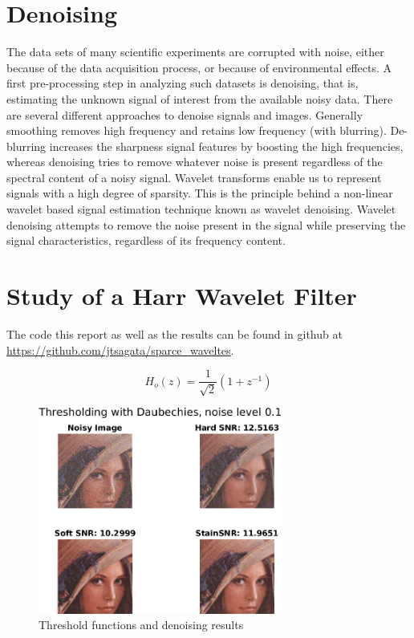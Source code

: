 \documentclass[a4paper,12pt]{article}
\begin{document}
\section {Denoising}
The data sets of many scientific experiments are corrupted with noise, either because of the data acquisition process, or because of environmental effects. A first pre-processing step in analyzing such datasets is denoising, that is, estimating the unknown signal of interest from the available noisy data. There are several different approaches to denoise signals and images. Generally smoothing removes high frequency and retains low frequency (with blurring). De-blurring increases the sharpness signal features by boosting the high frequencies, whereas denoising tries to remove whatever noise is present regardless of the spectral content of a noisy signal. Wavelet transforms enable us to represent signals with a high degree of sparsity. This is the principle behind a non-linear wavelet based signal estimation technique known as wavelet denoising. Wavelet denoising attempts to remove the noise present in the signal while preserving the signal characteristics, regardless of its frequency content.

\section{Study of a Harr Wavelet Filter}
The code this report as well as the results can be found in  github at \url{https://github.com/jtsagata/sparce_waveltes}.

$$
H_o(z) = \frac{1}{\sqrt{2}}\left( 1 + z^{-1}\right)
$$


\begin{figure}[t]
        \centering
        \includegraphics[width=8cm]{../Results/leana_threshold.png}
        \caption{Threshold functions and denoising results}
		\label{fig:threshold}
\end{figure}
\end{document}
